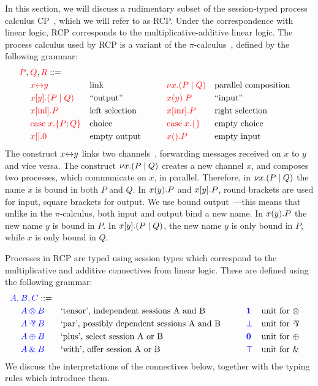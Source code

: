 \documentclass[a4paper,UKenglish]{lipics-v2016}
\begin{document}
In this section, we will discuss a rudimentary subset of the session-typed
process calculus CP~\cite{wadler2012}, which we will refer to as RCP.
Under the correspondence with linear logic, RCP corresponds to the
multiplicative-additive linear logic.
The process calculus used by RCP is a variant of the
$\pi$-calculus~\cite{milner1992b}, defined by
the following grammar:
\[
  \begin{aligned}
    \red{P},\:&\red{Q},\red{R} ::=\\
    &       \red{\link{x}{y}}           &&\text{link}
    &\qquad&\red{\cut{x}(P \mid Q)}     &&\text{parallel composition}\\
    &       \red{\send{x}{y}(P \mid Q)} &&\text{``output''}
    &\qquad&\red{\recv{x}{y}P}          &&\text{``input''}\\
    &       \red{\inl{x}P}              &&\text{left selection}
    &\qquad&\red{\inr{x}P}              &&\text{right selection}\\
    &       \red{\case{x}{P}{Q}}        &&\text{choice}
    &\qquad&\red{\case{x}{}{}}          &&\text{empty choice}\\
    &       \red{\send{x}{}0}           &&\text{empty output}
    &\qquad&\red{\recv{x}{}P}           &&\text{empty input}\\
  \end{aligned}
\]
The construct ${x{\leftrightarrow}y}$ links two channels~\cite{sangiorgi1996,boreale1998},
forwarding messages received on $x$ to $y$ and vice versa.
%
The construct ${\nu x.}{(P \mid Q)}$ creates a new channel $x$, and composes two
processes, which communicate on $x$, in parallel.
Therefore, in ${\nu x.}{(P \mid Q)}$ the name $x$ is bound in both $P$ and $Q$.
%
In ${x(y).}P$ and ${x[y].}P$, round brackets are used for input, square
brackets for output.
We use bound output~\cite{sangiorgi1996}---this means that unlike in the
$\pi$-calculus, both input and output bind a new name.
In ${x(y).}P$ the new name $y$ is bound in $P$.
In ${x[y].}{(P \mid Q)}$, the new name $y$ is only bound in $P$, while $x$
is only bound in $Q$.

Processes in RCP are typed using session types which correspond to the
multiplicative and additive connectives from linear logic. These are defined
using the following grammar:
\[
  \begin{aligned}
    \blue{A},\:&\blue{B},\blue{C} ::=\\
    &       \tm{A \tens B} &&\text{`tensor', independent sessions A and B}
    &\qquad&\tm{\one}      &&\text{unit for \tens}\\
    &       \tm{A \parr B} &&\text{`par', possibly dependent sessions A and B}
    &\qquad&\tm{\bot}      &&\text{unit for \parr}\\
    &       \tm{A \plus B} &&\text{`plus', select session A or B}
    &\qquad&\tm{\nil}      &&\text{unit for \plus}\\
    &       \tm{A \with B} &&\text{`with', offer session A or B}
    &\qquad&\tm{\top}      &&\text{unit for \with}
  \end{aligned}
\]
We discuss the interpretations of the connectives below, together with the
typing rules which introduce them.
\end{document}
